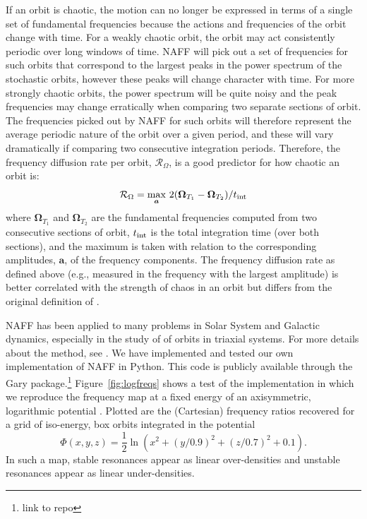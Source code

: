\documentclass[letterpaper,12pt,preprint]{aastex}
\newcommand{\bs}[1]{\boldsymbol{#1}}
\newcommand{\inttime}{t_{\rm int}}
\newcommand{\fdrate}{\mathcal{R}_\Omega}
\begin{document}
If an orbit is chaotic, the motion can no longer be expressed in terms of a single set of fundamental frequencies because the actions and frequencies of the orbit change with time. For a weakly chaotic orbit, the orbit may act consistently periodic over long windows of time. NAFF will pick out a set of frequencies for such orbits that correspond to the largest peaks in the power spectrum of the stochastic orbits, however these peaks will change character with time. For more strongly chaotic orbits, the power spectrum will be quite noisy and the peak frequencies may change erratically when comparing two separate sections of orbit. The frequencies picked out by NAFF for such orbits will therefore represent the average periodic nature of the orbit over a given period, and these will vary dramatically if comparing two consecutive integration periods. Therefore, the frequency diffusion rate per orbit, $\fdrate$, is a good predictor for how chaotic an orbit is:
\begin{equation}
	\fdrate = \max_{\bs{a}}\,2(\bs{\Omega}_{T_1} - \bs{\Omega}_{T_2}) / \inttime \label{eq:fdrate}
\end{equation}
where $\bs{\Omega}_{T_1}$ and $\bs{\Omega}_{T_2}$ are the fundamental frequencies computed from two consecutive sections of orbit, $\inttime$ is the total integration time (over both sections), and the maximum is taken with relation to the corresponding amplitudes, $\bs{a}$, of the frequency components. The frequency diffusion rate as defined above (e.g., measured in the frequency with the largest amplitude) is better correlated with the strength of chaos in an orbit \citep{valluri??} but differs from the original definition of \cite{valluri98}.

NAFF has been applied to many problems in Solar System and Galactic dynamics, especially in the study of of orbits in triaxial systems. For more details about the method, see \cite{papaphilippou96, laskar, etc.}. We have implemented and tested our own implementation of NAFF in Python. This code is publicly available through the Gary package.\footnote{link to repo} Figure~\ref{fig:logfreqs} shows a test of the implementation in which we reproduce the frequency map at a fixed energy of an axisymmetric, logarithmic potential \cite[][pg. 260, Figure~3.45]{binneytremaine}. Plotted are the (Cartesian) frequency ratios recovered for a grid of iso-energy, box orbits integrated in the potential
\begin{equation}
	\Phi(x,y,z) = \frac{1}{2}\ln\left(x^2 + (y/0.9)^2 + (z/0.7)^2 + 0.1\right).
\end{equation}
In such a map, stable resonances appear as linear over-densities and unstable resonances appear as linear under-densities. 
\end{document}
